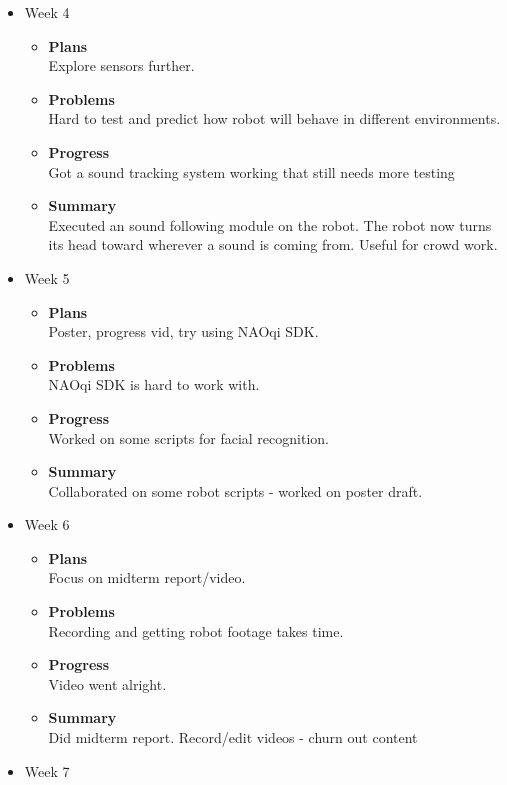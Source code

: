 \begin{itemize}
		\item{Week 4}
			\begin{itemize}
				\item \textbf{Plans} \\
				Explore sensors further.
				\item \textbf{Problems} \\
				Hard to test and predict how robot will behave in different environments.
				\item \textbf{Progress} \\
				Got a sound tracking system working that still needs more testing
				\item \textbf{Summary} \\
				Executed an sound following module on the robot. The robot now turns its head toward wherever a sound is coming from. Useful for crowd work.
			\end{itemize}
		\item{Week 5}
			\begin{itemize}
				\item \textbf{Plans} \\
				Poster, progress vid, try using NAOqi SDK.
				\item \textbf{Problems} \\
				NAOqi SDK is hard to work with.
				\item \textbf{Progress} \\
				Worked on some scripts for facial recognition.
				\item \textbf{Summary} \\
				Collaborated on some robot scripts - worked on poster draft.
			\end{itemize}
		\item{Week 6}
			\begin{itemize}
				\item \textbf{Plans} \\
				Focus on midterm report/video.
				\item \textbf{Problems} \\
				Recording and getting robot footage takes time.
				\item \textbf{Progress} \\
				Video went alright.
				\item \textbf{Summary} \\
				Did midterm report. Record/edit videos - churn out content
			\end{itemize}
		\item{Week 7}
			\begin{itemize}

\end{itemize}
\end{itemize}
